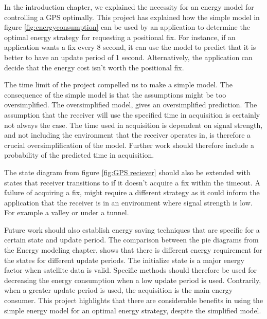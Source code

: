In the introduction chapter, we explained the necessity for an energy model for controlling a GPS optimally. This project has explained how the simple model in figure \ref{fig:energyconsumption} can be used by an application to determine the optimal energy strategy for requesting a positional fix. For instance, if an application wants a fix every 8 second, it can use the model to predict that it is better to have an update period of 1 second. Alternatively, the application can decide that the energy cost isn't worth the positional fix. 

The time limit of the project compelled us to make a simple model. The consequence of the simple model is that the assumptions might be too oversimplified. The oversimplified model, gives an oversimplified prediction. The assumption that the receiver will use the specified time in acquisition is certainly not always the case. The time used in acquisition is dependent on signal strength, and not including the environment that the receiver operates in, is therefore a crucial oversimplification of the model. Further work should therefore include a probability of the predicted time in acquisition. 

The state diagram from figure \ref{fig:GPS reciever} should also be extended with states that receiver transitions to if it doesn't acquire a fix within the timeout. A failure of acquiring a fix, might require a different strategy as it could inform the application that the receiver is in an environment where signal strength is low. For example a valley or under a tunnel. 

Future work should also establish energy saving techniques that are specific for a certain state and update period. The comparison between the pie diagrams from the Energy modeling chapter, shows that there is different energy requirement for the states for different update periods. The initialize state is a major energy factor when satellite data is valid. Specific methods should therefore be used for decreasing the energy consumption when a low update period is used. Contrarily, when a greater update period is used, the acquisition is the main energy consumer. This project highlights that there are considerable benefits in using the simple energy model for an optimal energy strategy, despite the simplified model. 
